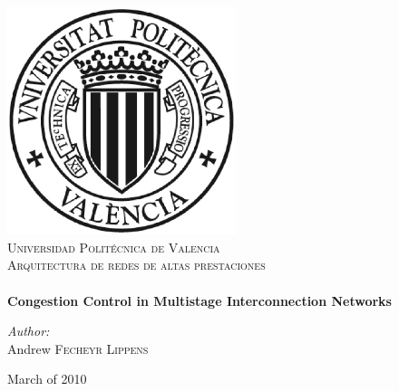 \begin{titlepage}
\begin{center}
 
\includegraphics[width=0.50\textwidth]{figures/logoUPV.eps}\\[1cm]
\textsc{\LARGE Universidad Polit\'ecnica de Valencia}\\[1.4cm]
\textsc{\Large Arquitectura de redes de altas prestaciones}\\[1.4cm]
 
 
\HRule \\[0.4cm]
{ \huge \bfseries Congestion Control in Multistage Interconnection Networks}
\HRule \\[1.4cm]
 
\begin{flushleft} \large
\emph{Author:}\\
Andrew \textsc{Fecheyr} \textsc{Lippens}
\end{flushleft}

\vfill
 
{\large March of 2010}
 
\end{center}
\end{titlepage}